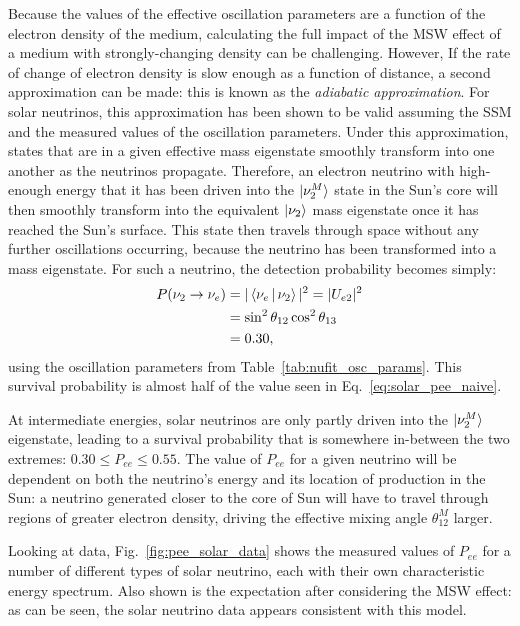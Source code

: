Because the values of the effective oscillation parameters are a function of the electron density of the medium, calculating the full impact of the MSW effect of a medium with strongly-changing density can be challenging. However, If the rate of change of electron density is slow enough as a function of distance, a second approximation can be made: this is known as the \textit{adiabatic approximation}. For solar neutrinos, this approximation has been shown to be valid assuming the SSM and the measured values of the oscillation parameters. Under this approximation, states that are in a given effective mass eigenstate smoothly transform into one another as the neutrinos propagate. Therefore, an electron neutrino with high-enough energy that it has been driven into the $\ket{\nu_{2}^{M}}$ state in the Sun's core will then smoothly transform into the equivalent $\ket{\nu_{2}}$ mass eigenstate once it has reached the Sun's surface. This state then travels through space without any further oscillations occurring, because the neutrino has been transformed into a mass eigenstate. For such a neutrino, the detection probability becomes simply:
\begin{align}
    P(\nu_{2}\to\nu_{e}) &= |\Braket{\nu_{e}|\nu_{2}}|^{2} = |U_{e2}|^{2}\\
                         &= \sin^{2}\theta_{12}{}\cos^{2}\theta_{13}\\
                         &= 0.30,
\end{align}
using the oscillation parameters from Table~\ref{tab:nufit_osc_params}. This survival probability is almost half of the value seen in Eq.~\ref{eq:solar_pee_naive}.

At intermediate energies, solar neutrinos are only partly driven into the $\ket{\nu_{2}^{M}}$ eigenstate, leading to a survival probability that is somewhere in-between the two extremes: $0.30\leq P_{ee} \leq 0.55$. The value of $P_{ee}$ for a given neutrino will be dependent on both the neutrino's energy and its location of production in the Sun: a neutrino generated closer to the core of Sun will have to travel through regions of greater electron density, driving the effective mixing angle $\theta_{12}^{M}$ larger.

Looking at data, Fig.~\ref{fig:pee_solar_data} shows the measured values of $P_{ee}$ for a number of different types of solar neutrino, each with their own characteristic energy spectrum. Also shown is the expectation after considering the MSW effect: as can be seen, the solar neutrino data appears consistent with this model.

